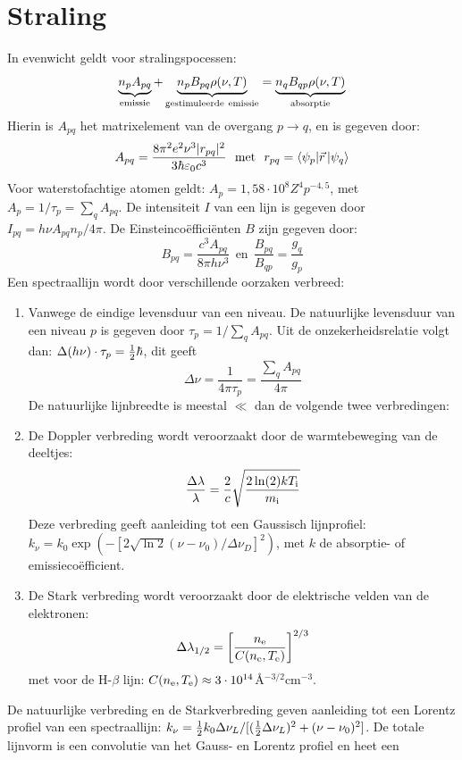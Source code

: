 \documentclass[twoside]{report}
\begin{document}
\section{Straling}
In evenwicht geldt voor stralingspocessen:
\[
\underbrace{n_pA_{pq}}_{\rm emissie}+
\underbrace{n_pB_{pq}\rho(\nu,T)}_{\rm gestimuleerde~emissie}=
\underbrace{n_qB_{qp}\rho(\nu,T)}_{\rm absorptie}
\]
Hierin is $A_{pq}$ het matrixelement van de overgang $p\rightarrow q$, en is
gegeven door:
\[
A_{pq}=\frac{8\pi^2e^2\nu^3|r_{pq}|^2}{3\hbar\varepsilon_0c^3}~~\mbox{met}~~
r_{pq}=\langle\psi_p|\vec{r}\,|\psi_q\rangle
\]
Voor waterstofachtige atomen geldt: $A_p=1,58\cdot10^8Z^4p^{-4,5}$, met
$A_p=1/\tau_p=\sum\limits_qA_{pq}$. De intensiteit $I$ van een lijn is
gegeven door $I_{pq}=h\nu A_{pq}n_p/4\pi$. De Einsteinco\"effici\"enten $B$
zijn gegeven door:
\[
B_{pq}=\frac{c^3A_{pq}}{8\pi h\nu^3}~~\mbox{en}~~\frac{B_{pq}}{B_{qp}}=\frac{g_q}{g_p}
\]
Een spectraallijn wordt door verschillende oorzaken verbreed:
\begin{enumerate}
\item Vanwege de eindige levensduur van een niveau. De natuurlijke levensduur
      van een niveau $p$ is gegeven door $\tau_p=1/\sum\limits_q A_{pq}$. Uit
      de onzekerheidsrelatie volgt dan: $\Delta(h\nu)\cdot\tau_p=\mbox{$\frac{1}{2}$}\hbar$,
      dit geeft
      \[
      \Delta\nu=\frac{1}{4\pi\tau_p}=\frac{\sum\limits_qA_{pq}}{4\pi}
      \]
      De natuurlijke lijnbreedte is meestal $\ll$ dan de volgende twee
      verbredingen:
\item De Doppler verbreding wordt veroorzaakt door de warmtebeweging van de
      deeltjes:
      \[
      \frac{\Delta\lambda}{\lambda}=\frac{2}{c}\sqrt{\frac{2\ln(2)kT_{\rm i}}{m_{\rm i}}}
      \]
      Deze verbreding geeft aanleiding tot een Gaussisch lijnprofiel:\\
      $k_\nu=k_0\exp(-[2\sqrt{\ln 2}(\nu-\nu_0)/\Delta\nu_D]^2)$, met $k$ de
      absorptie- of emissieco\"efficient.
\item De Stark verbreding wordt veroorzaakt door de elektrische velden van de
      elektronen:
      \[
      \Delta\lambda_{1/2}=\left[\frac{n_{\rm e}}{C(n_{\rm e},T_{\rm e})}\right]^{2/3}
      \]
      met voor de H-$\beta$ lijn: $C(n_{\rm e},T_{\rm e})\approx3\cdot10^{14}$\AA$^{-3/2}$cm$^{-3}$.
\end{enumerate}
De natuurlijke verbreding en de Starkverbreding geven aanleiding tot een
Lorentz profiel van een spectraallijn:
$k_\nu=\mbox{$\frac{1}{2}$} k_0\Delta\nu_L/[(\mbox{$\frac{1}{2}$}\Delta\nu_L)^2+(\nu-\nu_0)^2]$. De totale
lijnvorm is een convolutie van het Gauss- en Lorentz profiel en heet een
\end{document}
